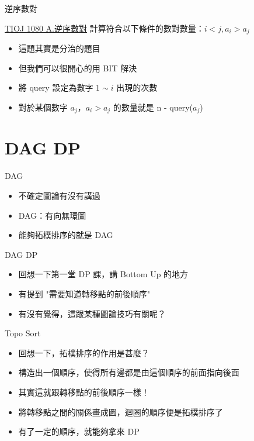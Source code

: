 \documentclass[aspectratio=169]{beamer}
\begin{document}
    \begin{frame}{逆序數對}
        \begin{block}{\href{https://tioj.ck.tp.edu.tw/problems/1080}{TIOJ 1080 A.逆序數對}}
            計算符合以下條件的數對數量：$i < j, a_i > a_j$
        \end{block}

        \begin{itemize}
            \item<1-> 這題其實是分治的題目
            \item<2-> 但我們可以很開心的用 BIT 解決
            \item<3-> 將 query 設定為數字 $1 \sim i$ 出現的次數
            \item<4-> 對於某個數字 $a_j$，$a_i > a_j$ 的數量就是 n - query($a_j$)
        \end{itemize}
    \end{frame}

    \section{DAG DP}

    \begin{frame}{DAG}
        \begin{itemize}
            \item 不確定圖論有沒有講過
            \item DAG：有向無環圖
            \item 能夠拓樸排序的就是 DAG
        \end{itemize}
    \end{frame}

    \begin{frame}{DAG DP}
        \begin{itemize}
            \item 回想一下第一堂 DP 課，講 Bottom Up 的地方
            \item 有提到 "需要知道轉移點的前後順序"
            \item 有沒有覺得，這跟某種圖論技巧有關呢？
        \end{itemize}
    \end{frame}

    \begin{frame}{Topo Sort}
        \begin{itemize}
            \item<1-> 回想一下，拓樸排序的作用是甚麼？
            \item<2-> 構造出一個順序，使得所有邊都是由這個順序的前面指向後面
            \item<3-> 其實這就跟轉移點的前後順序一樣！
            \item<4-> 將轉移點之間的關係畫成圖，迴圈的順序便是拓樸排序了
            \item<5-> 有了一定的順序，就能夠拿來 DP
        \end{itemize}
    \end{frame}
\end{document}
